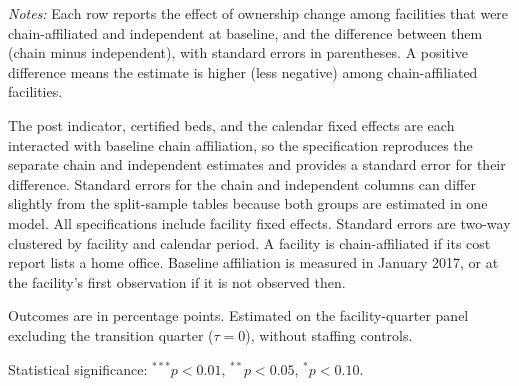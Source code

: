 \begin{table}[!ht]
\begin{threeparttable}
\begin{tablenotes}[flushleft]
\footnotesize
\item \textit{Notes:} Each row reports the effect of ownership change among facilities that were chain-affiliated and independent at baseline, and the difference between them (chain minus independent), with standard errors in parentheses. A positive difference means the estimate is higher (less negative) among chain-affiliated facilities.
\item The post indicator, certified beds, and the calendar fixed effects are each interacted with baseline chain affiliation, so the specification reproduces the separate chain and independent estimates and provides a standard error for their difference. Standard errors for the chain and independent columns can differ slightly from the split-sample tables because both groups are estimated in one model. All specifications include facility fixed effects. Standard errors are two-way clustered by facility and calendar period. A facility is chain-affiliated if its cost report lists a home office. Baseline affiliation is measured in January 2017, or at the facility's first observation if it is not observed then.
\item Outcomes are in percentage points. Estimated on the facility-quarter panel excluding the transition quarter ($\tau = 0$), without staffing controls.
\item Statistical significance: $^{***}p<0.01$, $^{**}p<0.05$, $^{*}p<0.10$.
\end{tablenotes}

\end{threeparttable}
\end{table}
